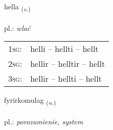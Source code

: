 \documentclass[frontgrid, backgrid]{flacards}\usepackage[]{graphicx}\usepackage[]{xcolor}
\begin{document}
\renewcommand{\flhead}{\vskip5pt \fboxsep=0pt {\small\bfseries\footnotesize Sagnorð | Verb}}
\renewcommand{\fcfoot}{\vskip5pt \fboxsep=0pt \hspace{2pt}{\small\bfseries\footnotesize 2K}}

\renewcommand{\blhead}{\vskip5pt {\small\bfseries\footnotesize Sagnorð | Verb }}
\renewcommand{\bcfoot}{\vskip5pt \hspace{2pt}{\small\bfseries\footnotesize 2K}}


{hella \small{\textsubscript{(\textit{v.})}} \\[1ex] %
\textphonetic{[hɛtla]} \\
pl.: \emph{wlać} \\  [2ex]
\renewcommand*{\arraystretch}{0.8}
\begin{tabular}{p{1cm}l}
\textsc{1sg}: & helli -- hellti -- hellt \\ 
\textsc{2sg}: & hellir -- helltir -- hellt \\ 
\textsc{3sg}: & hellir -- hellti -- hellt \\ 
\end{tabular}
}

\renewcommand{\flhead}{\vskip5pt \fboxsep=0pt {\small\bfseries\footnotesize Nafnorð | Noun}}
\renewcommand{\fcfoot}{\vskip5pt \fboxsep=0pt \hspace{2pt}{\small\bfseries\footnotesize 2K}}

\renewcommand{\blhead}{\vskip5pt {\small\bfseries\footnotesize Nafnorð | Noun }}
\renewcommand{\bcfoot}{\vskip5pt \hspace{2pt}{\small\bfseries\footnotesize 2K}}


{fyrirkomulag \small{\textsubscript{(\textit{n.})}} \\[1ex] %
 \\
pl.: \emph{porozumienie, system} \\  [2ex]
\renewcommand*{\arraystretch}{0.8}
}
\end{document}
